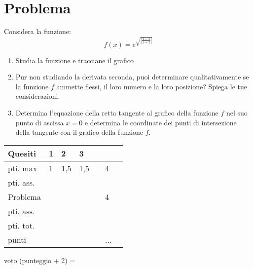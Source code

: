              \section*{Problema}
                           Considera la funzione:
                           \begin{equation*}
                                        f\left(x\right)=e^{\sqrt{\left|\frac{1-x}{x+2}\right|}}
                           \end{equation*}
            
                           \begin{enumerate}
                                        \item Studia la funzione e tracciane il grafico
                                        \item Pur non studiando la derivata seconda, puoi determinare qualitativamente se la funzione $f$ ammette flessi, il loro numero e la loro posizione? Spiega le tue considerazioni.
                                        \item Determina l'equazione della retta tangente al grafico della funzione $f$ nel suo punto di ascissa $x=0$ e determina le coordinate dei punti di intersezione della tangente con il grafico della funzione $f$.
                           \end{enumerate}
                           \vspace{,5 cm}
\begin{tabular}{lp{}p{}p{}p{}p{}l}
                           Quesiti             & 1 &  2  &  3  &  &    \\
                           \toprule
                           pti. max            & 1 & 1,5 & 1,5 &  &  4 \\
                           \toprule
                           pti. ass.                            &   &     &     &  &    \\
                           \toprule
                           Problema            &   &     &     &  &  4 \\
                           \toprule
                           pti. ass.           &   &     &     &  &    \\
                           \toprule
                           pti. tot.                            &   &     &     &  &    \\
 
                           punti               &   &     &     &  & ...\\
                           \midrule
             \end{tabular}
 
             \vspace{0,5cm}
             voto (punteggio + 2) =
             \vspace{1cm}
                          
